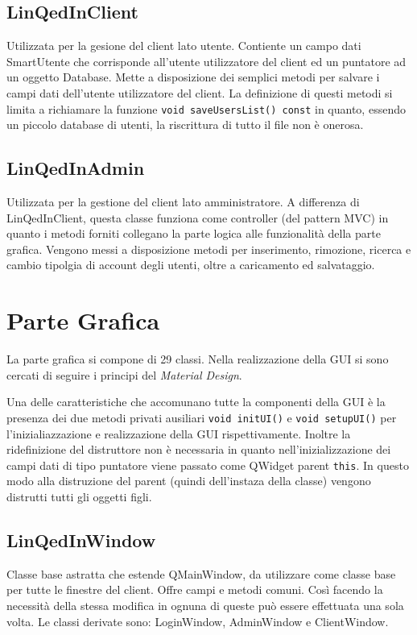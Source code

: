 \documentclass[a4paper,10pt]{article}
\begin{document}
\subsection*{LinQedInClient}
Utilizzata per la gesione del client lato utente. Contiente un campo dati SmartUtente che corrisponde all'utente utilizzatore del client ed un puntatore ad un oggetto Database. Mette a disposizione dei semplici metodi per salvare i campi dati dell'utente utilizzatore del client. La definizione di questi metodi si limita a richiamare la funzione \texttt{void saveUsersList() const} in quanto, essendo un piccolo database di utenti, la riscrittura di tutto il file non è onerosa.

\subsection*{LinQedInAdmin}
Utilizzata per la gestione del client lato amministratore. A differenza di LinQedInClient, questa classe funziona come controller (del pattern MVC) in quanto i metodi forniti collegano la parte logica alle funzionalità della parte grafica. Vengono messi a disposizione metodi per inserimento, rimozione, ricerca e cambio tipolgia di account degli utenti, oltre a caricamento ed salvataggio.

\section*{Parte Grafica}
La parte grafica si compone di 29 classi. Nella realizzazione della GUI si sono cercati di seguire i principi del \textit{Material Design}.

Una delle caratteristiche che accomunano tutte la componenti della GUI è la presenza dei due metodi privati ausiliari \texttt{void initUI()} e \texttt{void setupUI()} per l'inizialiazzazione e realizzazione della GUI rispettivamente. Inoltre la ridefinizione del distruttore non è necessaria in quanto nell'inizializzazione dei campi dati di tipo puntatore viene passato come QWidget parent \texttt{this}. In questo modo alla distruzione del parent (quindi dell'instaza della classe) vengono distrutti tutti gli oggetti figli.

\subsection*{LinQedInWindow}
Classe base astratta che estende QMainWindow, da utilizzare come classe base per tutte le finestre del client. Offre campi e metodi comuni. Così facendo la necessità della stessa modifica in ognuna di queste può essere effettuata una sola volta. Le classi derivate sono: LoginWindow, AdminWindow e ClientWindow.
\end{document}
